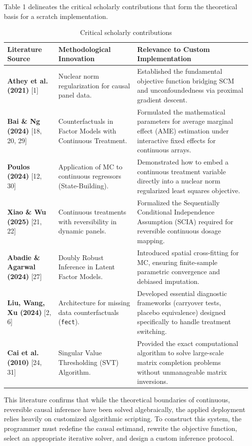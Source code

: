 \documentclass{article}
\begin{document}
Table 1 delineates the critical scholarly contributions that form the theoretical basis for a scratch implementation.

\begin{table}[h]
\centering
\begin{tabular}{p{} p{} p{}}
\toprule
\textbf{Literature Source} & \textbf{Methodological Innovation} & \textbf{Relevance to Custom Implementation} \\
\midrule
\textbf{Athey et al. (2021)} [1] & Nuclear norm regularization for causal panel data. & Established the fundamental objective function bridging SCM and unconfoundedness via proximal gradient descent. \\
\textbf{Bai \& Ng (2024)} [18, 20, 29] & Counterfactuals in Factor Models with Continuous Treatment. & Formulated the mathematical parameters for average marginal effect (AME) estimation under interactive fixed effects for continuous arrays. \\
\textbf{Poulos (2024)} [12, 30] & Application of MC to continuous regressors (State-Building). & Demonstrated how to embed a continuous treatment variable directly into a nuclear norm regularized least squares objective. \\
\textbf{Xiao \& Wu (2025)} [21, 22] & Continuous treatments with reversibility in dynamic panels. & Formalized the Sequentially Conditional Independence Assumption (SCIA) required for reversible continuous dosage mapping. \\
\textbf{Abadie \& Agarwal (2024)} [27] & Doubly Robust Inference in Latent Factor Models. & Introduced spatial cross-fitting for MC, ensuring finite-sample parametric convergence and debiased imputation. \\
\textbf{Liu, Wang, Xu (2024)} [2, 6] & Architecture for missing data counterfactuals (\texttt{fect}). & Developed essential diagnostic frameworks (carryover tests, placebo equivalence) designed specifically to handle treatment switching. \\
\textbf{Cai et al. (2010)} [24, 31] & Singular Value Thresholding (SVT) Algorithm. & Provided the exact computational algorithm to solve large-scale matrix completion problems without unmanageable matrix inversions. \\
\bottomrule
\end{tabular}
\caption{Critical scholarly contributions}
\end{table}

This literature confirms that while the theoretical boundaries of continuous, reversible causal inference have been solved algebraically, the applied deployment relies heavily on customized algorithmic scripting. To construct this system, the programmer must redefine the causal estimand, rewrite the objective function, select an appropriate iterative solver, and design a custom inference protocol.
\end{document}
